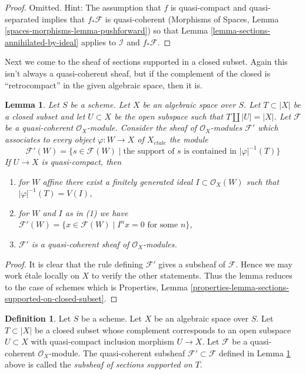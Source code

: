 \documentclass{stacks-project}
\theoremstyle{plain}
\newtheorem{lemma}[subsection]{Lemma}
\theoremstyle{definition}
\newtheorem{definition}[subsection]{Definition}
\theoremstyle{remark}
\numberwithin{equation}{subsection}
\def\etale{{\acute{e}tale}}
\begin{document}
\begin{proof}
Omitted. Hint: The assumption that $f$ is quasi-compact and
quasi-separated implies that $f_*\mathcal{F}$ is quasi-coherent
(Morphisms of Spaces, Lemma \ref{spaces-morphisms-lemma-pushforward})
so that Lemma \ref{lemma-sections-annihilated-by-ideal} applies
to $\mathcal{I}$ and $f_*\mathcal{F}$.
\end{proof}

\noindent
Next we come to the sheaf of sections supported in a closed subset.
Again this isn't always a quasi-coherent sheaf, but if the complement
of the closed is ``retrocompact'' in the given algebraic space, then
it is.

\begin{lemma}
\label{lemma-sections-supported-on-closed-subset}
Let $S$ be a scheme. Let $X$ be an algebraic space over $S$.
Let $T \subset |X|$ be a closed subset and let $U \subset X$ be
the open subspace such that $T \amalg |U| = |X|$.
Let $\mathcal{F}$ be a quasi-coherent $\mathcal{O}_X$-module.
Consider the sheaf of $\mathcal{O}_X$-modules $\mathcal{F}'$
which associates to every object $\varphi : W \to X$ of
$X_\etale$ the module
$$
\mathcal{F}'(W)
=
\{s \in \mathcal{F}(W) \mid
\text{the support of }s\text{ is contained in }|\varphi|^{-1}(T)\}
$$
If $U \to X$ is quasi-compact, then
\begin{enumerate}
\item for $W$ affine there exist a finitely generated
ideal $I \subset \mathcal{O}_X(W)$ such that $|\varphi|^{-1}(T) = V(I)$,
\item for $W$ and $I$ as in (1) we have
$\mathcal{F}'(W) = \{x \in \mathcal{F}(W) \mid
I^nx = 0 \text{ for some } n\}$,
\item $\mathcal{F}'$ is a quasi-coherent sheaf of $\mathcal{O}_X$-modules.
\end{enumerate}
\end{lemma}

\begin{proof}
It is clear that the rule defining $\mathcal{F}'$ gives a subsheaf
of $\mathcal{F}$. Hence we may work \'etale locally on $X$ to verify
the other statements. Thus the lemma reduces to the case of schemes
which is
Properties, Lemma \ref{properties-lemma-sections-supported-on-closed-subset}.
\end{proof}

\begin{definition}
\label{definition-subsheaf-sections-supported-on-closed}
Let $S$ be a scheme. Let $X$ be an algebraic space over $S$.
Let $T \subset |X|$ be a closed subset whose complement
corresponds to an open subspace $U \subset X$
with quasi-compact inclusion morphism $U \to X$.
Let $\mathcal{F}$ be a quasi-coherent $\mathcal{O}_X$-module.
The quasi-coherent subsheaf $\mathcal{F}' \subset \mathcal{F}$ defined in
Lemma \ref{lemma-sections-supported-on-closed-subset} above is called
the {\it subsheaf of sections supported on $T$}.
\end{definition}
\end{document}
